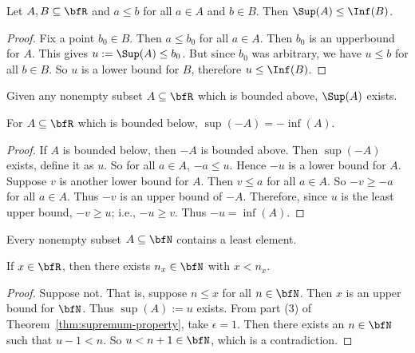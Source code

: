     \begin{proposition}
        Let $A,B \subseteq \bfR$ and $a \leq b$ for all $a \in A$ and $b \in B$. Then $\Sup(A) \leq \Inf(B)$.
    \end{proposition}
        \begin{proof}
            Fix a point $b_0 \in B$. Then $a \leq b_0$ for all $a \in A$. Then $b_0$ is an upperbound for $A$. This gives $u := \Sup(A) \leq b_0$. But since $b_0$ was arbitrary, we have $u \leq b$ for all $b \in B$. So $u$ is a lower bound for $B$, therefore $u \leq \Inf(B)$.
        \end{proof}

    \begin{axiom}
        Given any nonempty subset $A \subseteq \bfR$ which is bounded above, $\Sup(A)$ exists.
    \end{axiom}

    \begin{lemma}
        For $A \subseteq \bfR$ which is bounded below, $\sup(-A) = -\inf(A)$.
    \end{lemma}
        \begin{proof}
            If $A$ is bounded below, then $-A$ is bounded above. Then $\sup(-A)$ exists, define it as $u$. So for all $a \in A$, $-a \leq u$. Hence $-u$ is a lower bound for $A$. Suppose $v$ is another lower bound for $A$. Then $v \leq a$ for all $a \in A$. So $-v \geq -a$ for all $a \in A$. Thus $-v$ is an upper bound of $-A$. Therefore, since $u$ is the least upper bound, $-v \geq u$; i.e., $-u \geq v$. Thus $-u = \inf(A)$. 
        \end{proof}

    \begin{axiom}\label{axiom:wop}
        Every nonempty subset $A \subseteq \bfN$ contains a least element.
    \end{axiom}

    \begin{proposition}\label{prop:arch-1}
        If $x \in \bfR$, then there exists $n_x \in \bfN$ with $x < n_x$.
    \end{proposition}
        \begin{proof}
            Suppose not. That is, suppose $n \leq x$ for all $n \in \bfN$. Then $x$ is an upper bound for $\bfN$. Thus $\sup(A) := u$ exists. From part (3) of Theorem~\ref{thm:supremum-property}, take $\epsilon = 1$. Then there exists an $n \in \bfN$ such that $u - 1 < n$. So $u < n  + 1 \in \bfN$, which is a contradiction. 
        \end{proof}

